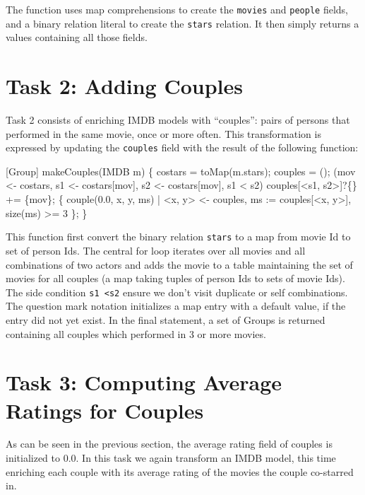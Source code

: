 \documentclass[submission,copyright,creativecommons]{eptcs}
\begin{document}
The function uses map comprehensions to create the \texttt{movies} and \texttt{people} fields, and a binary relation literal to create the \texttt{stars} relation. It then simply returns a values containing all those fields.



\section*{Task 2: Adding Couples}

Task 2 consists of enriching IMDB models with ``couples'': pairs of persons that performed in the same movie, once or more often. This transformation is expressed by updating the \texttt{couples} field with the result of the following function:

\begin{rascal}
[Group] makeCouples(IMDB m) \{{}
    costars = toMap(m.stars); couples = ();
     (mov \textless{}- costars, s1 \textless{}- costars{}[mov], s2 \textless{}- costars{}[mov], s1 \textless{} s2) 
       couples{}[\textless{}s1, s2\textgreater{}]?\{\} += \{{}mov\}{};
     \{{} couple(0.0, x, y, ms) 
                     | \textless{}x, y\textgreater{} \textless{}- couples, ms := couples{}[\textless{}x, y\textgreater{}], size(ms) \textgreater{}= 3 \}{};
\}{}
\end{rascal}

This function first convert the binary relation \texttt{stars} to a map from movie Id to set of person Ids. The central for loop iterates over all movies and all combinations of two actors and adds the movie to a table maintaining the set of movies for all couples (a map taking tuples of person Ids to sets of movie Ids). The side condition \texttt{s1 \textless s2} ensure we don't visit duplicate or self combinations.
The question mark notation initializes a map entry with a default value, if the entry did not yet exist.
In the final statement, a set of Groups is returned containing all couples which performed in 3 or more movies.




\section*{Task 3: Computing Average Ratings for Couples}

As can be seen in the previous section, the average rating field of couples is initialized to 0.0. In this task we again transform an IMDB model, this time enriching each couple with its average rating of the movies the couple co-starred in. 
\end{document}
